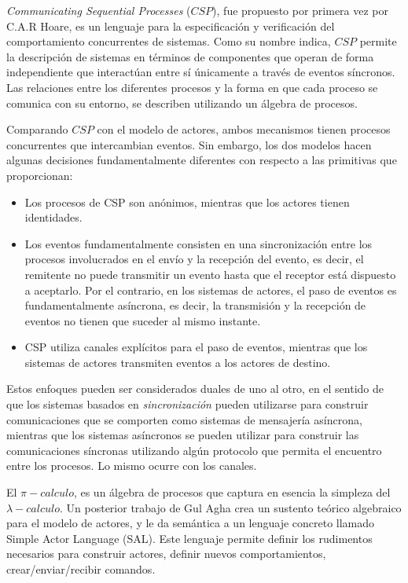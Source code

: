 \documentclass{article}
\begin{document}
\emph{Communicating Sequential Processes} ($CSP$), fue propuesto por primera vez por C.A.R Hoare\cite{Hoare:1978:CSP:359576.359585}, es un lenguaje para la especificación y verificación del comportamiento concurrentes de sistemas. Como su nombre indica, $CSP$ permite la descripción de sistemas en términos de componentes que operan de forma independiente que interactúan entre sí únicamente a través de eventos síncronos. Las relaciones entre los diferentes procesos y la forma en que cada proceso se comunica con su entorno, se describen utilizando un álgebra de procesos.

Comparando $CSP$ con el modelo de actores, ambos mecanismos tienen procesos concurrentes que intercambian eventos. Sin embargo, los dos modelos hacen algunas decisiones fundamentalmente diferentes con respecto a las primitivas que proporcionan:

\begin{itemize}
\item Los procesos de CSP son anónimos, mientras que los actores tienen identidades.
\item Los eventos fundamentalmente consisten en una sincronización entre los procesos involucrados en el envío y la recepción del evento, es decir, el remitente no puede transmitir un evento hasta que el receptor está dispuesto a aceptarlo. Por el contrario, en los sistemas de actores, el paso de eventos es fundamentalmente asíncrona, es decir, la transmisión y la recepción de eventos no tienen que suceder al mismo instante.
\item CSP utiliza canales explícitos para el paso de eventos, mientras que los sistemas de actores transmiten eventos a los actores de destino.
\end{itemize}

Estos enfoques pueden ser considerados duales de uno al otro, en el sentido de que los sistemas basados en \emph{sincronización} pueden utilizarse para construir comunicaciones que se comporten como sistemas de mensajería asíncrona, mientras que los sistemas asíncronos se pueden utilizar para construir las comunicaciones síncronas utilizando algún protocolo que permita el encuentro entre los procesos. Lo mismo ocurre con los canales.

El $\pi-calculo$, es un álgebra de procesos que captura en esencia la simpleza del $\lambda-calculo$. Un posterior trabajo de Gul Agha\cite{apicalculus} crea un sustento teórico algebraico para el modelo de actores, y le da semántica a un lenguaje concreto llamado Simple Actor Language (SAL). Este lenguaje permite definir los rudimentos necesarios para construir actores, definir nuevos comportamientos, crear/enviar/recibir comandos.
\end{document}
